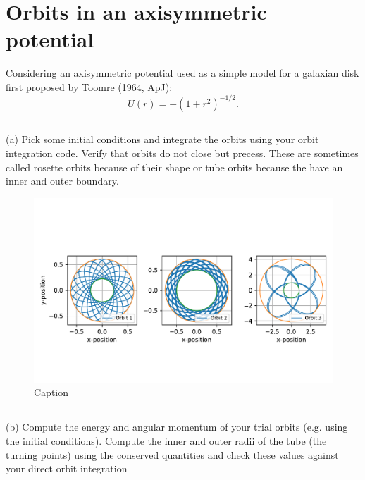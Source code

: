 \section{Orbits in an axisymmetric potential}
Considering an axisymmetric potential used as a simple model for a galaxian disk first proposed by Toomre (1964, ApJ):
\begin{equation}
    U(r) = -(1+r^2)^{-1/2}.
\end{equation}

\subsection{}
(a) Pick some initial conditions and integrate the orbits using your
orbit integration code. Verify that orbits do not close but precess.
These are sometimes called rosette orbits because of their shape
or tube orbits because the have an inner and outer boundary.

\begin{figure}
    \centering
    \includegraphics{CodeAndFigures/ToomrePotentialOrbits.pdf}
    \caption{Caption}
    \label{fig:my_label}
\end{figure}

\subsection{}
(b) Compute the energy and angular momentum of your trial orbits
(e.g. using the initial conditions). Compute the inner and outer
radii of the tube (the turning points) using the conserved quantities
and check these values against your direct orbit integration
